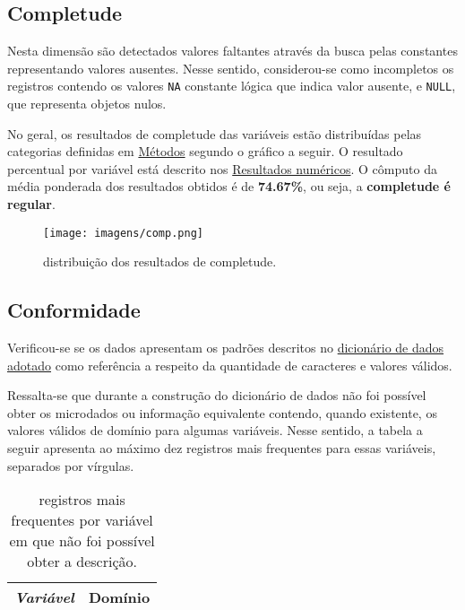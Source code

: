 \documentclass[
  12,
  table]{proadi}
\begin{document}
\hypertarget{completude}{%
\subsection{Completude}\label{completude}}

Nesta dimensão são detectados valores faltantes através da busca pelas
constantes representando valores ausentes. Nesse sentido, considerou-se
como incompletos os registros contendo os valores \texttt{NA} constante
lógica que indica valor ausente, e \texttt{NULL}, que representa objetos
nulos.

No geral, os resultados de completude das variáveis estão distribuídas
pelas categorias definidas em \protect\hyperlink{muxe9todos}{Métodos}
segundo o gráfico a seguir. O resultado percentual por variável está
descrito nos \protect\hyperlink{resultados-numuxe9ricos}{Resultados
numéricos}. O cômputo da média ponderada dos resultados obtidos é de
\textbf{74.67\%}, ou seja, a \textbf{completude é regular}.

\begin{figure}
\centering
\texttt{[image: imagens/comp.png]}
\caption{distribuição dos resultados de completude.}
\end{figure}

\hypertarget{conformidade}{%
\subsection{Conformidade}\label{conformidade}}

Verificou-se se os dados apresentam os padrões descritos no
\protect\hyperlink{dicionuxe1rio-adotado}{dicionário de dados adotado}
como referência a respeito da quantidade de caracteres e valores
válidos.

Ressalta-se que durante a construção do dicionário de dados não foi
possível obter os microdados ou informação equivalente contendo, quando
existente, os valores válidos de domínio para algumas variáveis. Nesse
sentido, a tabela a seguir apresenta ao máximo dez registros mais
frequentes para essas variáveis, separados por vírgulas.

\begingroup\fontsize{10}{12}\selectfont

\begin{longtable}[t]{>{}l>{\raggedright\arraybackslash}p{10cm}}
\caption{\label{tab:unnamed-chunk-12}registros mais frequentes por variável em que não foi possível obter a descrição.}\\
\toprule
\em{Variável} & Domínio\\


\bottomrule
\end{longtable}
\endgroup{}
\end{document}
